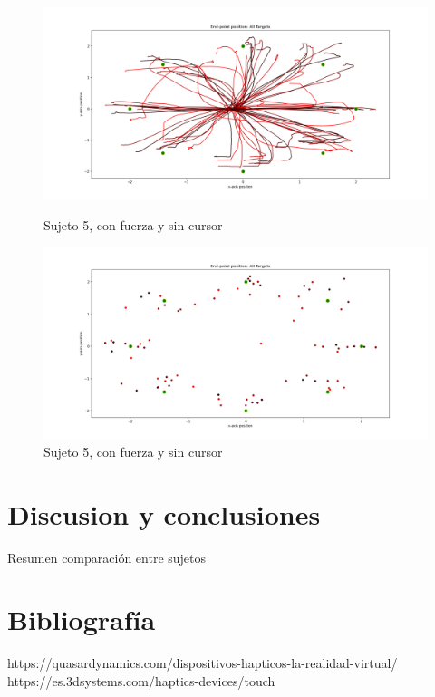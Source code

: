 \documentclass[a4paper,11pt, oneside]{book}
\begin{document}
\begin{figure}[H]
	\begin{minipage}[b]{0.5\linewidth}
		\centering
		\includegraphics[width=\linewidth]{sujeto5/force_no_cursor/trayectorias}
		\caption{Sujeto 5, con fuerza y sin cursor}
		\label{fig:figura1}
	\end{minipage}
	\hspace{0.5cm}
	\begin{minipage}[b]{0.5\linewidth}
		\centering
		\includegraphics[width=\linewidth]{sujeto5/force_no_cursor/trayectorias_puntos}
		\caption{Sujeto 5, con fuerza y sin cursor}
		\label{fig:figura2}
	\end{minipage}
\end{figure}

\chapter{Discusion y conclusiones}
Resumen comparación entre sujetos

\chapter{Bibliografía}
https://quasardynamics.com/dispositivos-hapticos-la-realidad-virtual/
https://es.3dsystems.com/haptics-devices/touch
\end{document}
